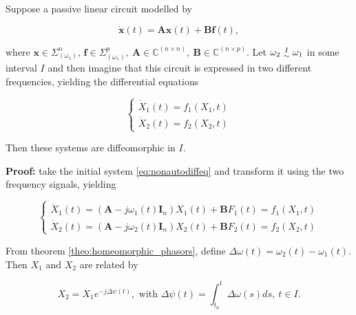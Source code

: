 \begin{theorem}\label{theo:diff_freqs} %
	Suppose a passive linear circuit modelled by

\begin{equation} \dot{\mathbf{x}}(t) = \mathbf{Ax}(t) + \mathbf{Bf}\left(t\right), \label{eq:nonautodiffeq} \end{equation}

	\noindent where $\mathbf{x}\in\Sigma_{\left(\omega_1\right)}^n$, $\mathbf{f}\in\Sigma_{\left(\omega_1\right)}^p,\ \mathbf{A}\in\mathbb{C}^{\left(n\times n\right)},\ \mathbf{B}\in\mathbb{C}^{\left(n\times p\right)}$. Let $\omega_2\ \substack{ I \\ \sim}\ \omega_1$ in some interval $I$ and then imagine that this circuit is expressed in two different frequencies, yielding the differential equations

\begin{equation}\left\{\begin{array}{l} \dot{X}_1(t) = f_1\left(X_1,t\right) \\[3mm] \dot{X}_2(t) = f_2\left(X_2,t\right) \end{array}\right. \label{eq:two_sols_freq_announce}\end{equation}\normalsize

	Then these systems are diffeomorphic in $I$.
\end{theorem}
\textbf{Proof:} take the initial system \eqref{eq:nonautodiffeq} and transform it using the two frequency signals, yielding

\begin{equation}\left\{\begin{array}{l} \dot{X}_1(t) = \left(\mathbf{A} - j\omega_1(t)\mathbf{I}_n\right)X_1(t) + \mathbf{B}F_1\left(t\right) = f_1\left(X_1,t\right) \\[3mm] \dot{X}_2(t) = \left(\mathbf{A} - j\omega_2(t)\mathbf{I}_n\right)X_2(t) + \mathbf{B}F_2\left(t\right) = f_2\left(X_2,t\right) \end{array}\right. \label{eq:two_sols_freq}\end{equation}

	From theorem \ref{theo:homeomorphic_phasors}, define $\Delta\omega(t) = \omega_2(t) - \omega_1(t)$. Then $X_1$ and $X_2$ are related by

\begin{equation} X_2 = X_1e^{-j\Delta\psi(t)}, \text{ with } \Delta\psi(t) = \int_{t_0}^t \Delta\omega(s)ds,\ t\in I. \label{eq:homeomorphic_phasors_equiv}\end{equation}

